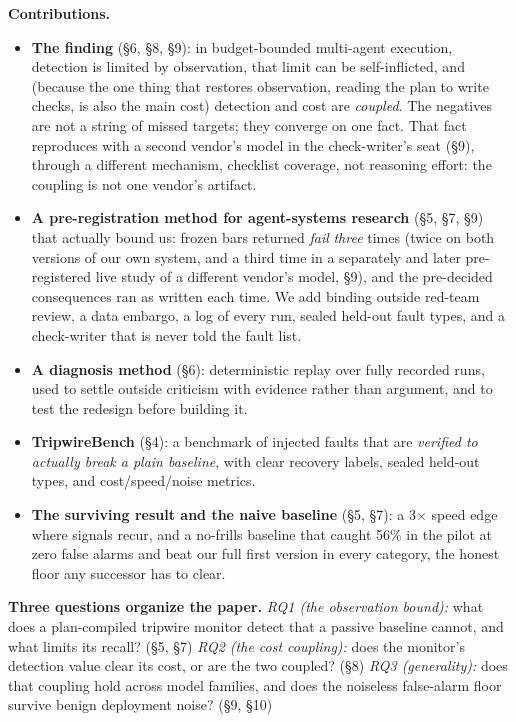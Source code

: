 \documentclass[acmsmall,screen]{acmart}
\begin{document}
\textbf{Contributions.}
\begin{itemize}
  \item \textbf{The finding} (\S6, \S8, \S9): in budget-bounded multi-agent
  execution, detection is limited by observation, that limit can be
  self-inflicted, and (because the one thing that restores observation, reading
  the plan to write checks, is also the main cost) detection and cost are
  \emph{coupled}. The negatives are not a string of missed targets; they converge
  on one fact. That fact reproduces with a second vendor's model in the
  check-writer's seat (\S9), through a different mechanism, checklist coverage,
  not reasoning effort: the coupling is not one vendor's artifact.
  \item \textbf{A pre-registration method for agent-systems research} (\S5,
  \S7, \S9) that actually bound us: frozen bars returned \emph{fail} \emph{three}
  times (twice on both versions of our own system, and a third time in a
  separately and later pre-registered live study of a different vendor's model,
  \S9), and the pre-decided consequences ran as written each time. We add
  binding outside red-team review, a data embargo, a log of every run, sealed
  held-out fault types, and a check-writer that is never told the fault list.
  \item \textbf{A diagnosis method} (\S6): deterministic replay over fully
  recorded runs, used to settle outside criticism with evidence rather than
  argument, and to test the redesign before building it.
  \item \textbf{TripwireBench} (\S4): a benchmark of injected faults that are
  \emph{verified to actually break a plain baseline}, with clear recovery
  labels, sealed held-out types, and cost/speed/noise metrics.
  \item \textbf{The surviving result and the naive baseline} (\S5, \S7): a
  3$\times$ speed edge where signals recur, and a no-frills baseline that
  caught 56\% in the pilot at zero false alarms and beat our full first version in every
  category, the honest floor any successor has to clear.
\end{itemize}

\textbf{Three questions organize the paper.} \emph{RQ1 (the observation bound):}
what does a plan-compiled tripwire monitor detect that a passive baseline cannot,
and what limits its recall? (\S5, \S7) \emph{RQ2 (the cost coupling):} does the
monitor's detection value clear its cost, or are the two coupled? (\S8)
\emph{RQ3 (generality):} does that coupling hold across model families, and does
the noiseless false-alarm floor survive benign deployment noise? (\S9, \S10)
\end{document}
